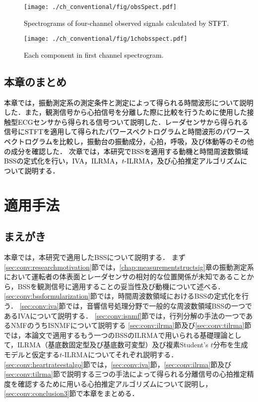 \begin{figure}[tb]
\centering
\texttt{[image: ./ch\_conventional/fig/obsSpect.pdf]}
\caption{\textcolor{black}{Spectrograms of four-channel observed signals calculated by STFT.}}
\label{fig:4chobsspect}
\end{figure}

\begin{figure}[tb]
\centering
\texttt{[image: ./ch\_conventional/fig/1chobsspect.pdf]}
\caption{\textcolor{black}{Each component in first channel spectrogram.}}
\label{fig:1chobsspect}
\end{figure}

\clearpage
\section{本章のまとめ}
\label{sec:conv:conclusion2}
\textcolor{black}{本章では，振動測定系の測定条件と測定によって得られる時間波形について説明した．また，観測信号から心拍信号を分離した際に比較を行うために使用した接触型ECGセンサから得られる信号ついて説明した．レーダセンサから得られる信号にSTFTを適用して得られたパワースペクトログラムと時間波形のパワースペクトログラムを比較し，振動台の振動成分，心拍，呼吸，及び体動等のその他の成分を確認した．
次章では，本研究でBSSを適用する動機と時間周波数領域BSSの定式化を行い，IVA，ILRMA，$t$-ILRMA，及び心拍推定アルゴリズムについて説明する．}


\chapter{適用手法}
\label{chap:methods}

\section{まえがき}
本章では，本研究で適用したBSSについて説明する．
まず\ref{sec:conv:researchmotivation}節では，{\ref{chap:measurementstructsig}章の振動測定系において運転者の体表面とレーダセンサの相対的な位置関係が未知であることから，BSSを観測信号に適用することの妥当性及び動機について述べる．}
\ref{sec:conv:bssformularization}節では，時間周波数領域におけるBSSの定式化を行う．
{\ref{sec:conv:iva}節では，音響信号処理分野で一般的な周波数領域BSSの一つであるIVAについて説明する．}
\ref{sec:conv:isnmf}節では，行列分解の手法の一つであるNMFのうちISNMFについて説明する
{\ref{sec:conv:ilrma}節及び\ref{sec:conv:tilrma}節では，本論文で適用するもう一つのBSSのILRMAで用いられる基礎理論として，ILRMA（基底数固定型及び基底数可変型）及び複素Student's $t$分布を生成モデルと仮定する$t$-ILRMAについてそれぞれ説明する．
\ref{sec:conv:heartrateestalgo}節では，\ref{sec:conv:iva}節，\ref{sec:conv:ilrma}節及び\ref{sec:conv:tilrma}節で説明する三つの手法によって得られる分離信号の心拍推定精度を確認するために用いる心拍推定アルゴリズムについて説明し，\ref{sec:conv:conclusion3}節で本章をまとめる．}

